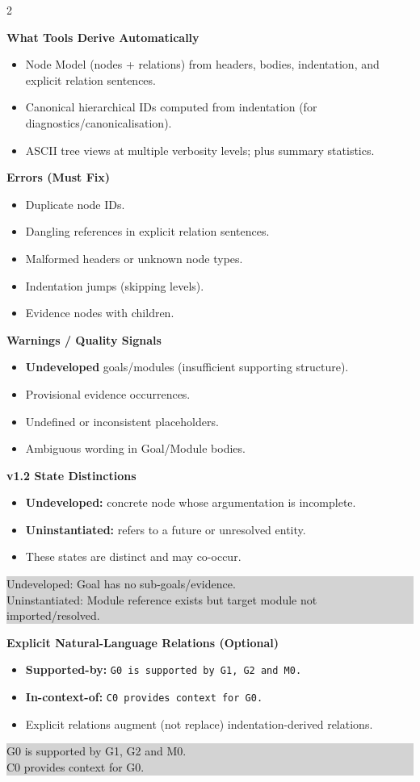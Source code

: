 \documentclass[10pt,letterpaper]{article}
\newcommand{\Sec}[1]{%
  \vspace{5pt}%
  \noindent{\color{RuleGray}\rule{\linewidth}{0.35pt}}\par
  \vspace{2pt}%
  {\bfseries #1}\par
  \vspace{2pt}%
}
\newcommand{\Example}[1]{%
  \vspace{1pt}%
  \noindent\colorbox{LightGray}{%
    \parbox{\linewidth}{\ttfamily\footnotesize\raggedright
#1
    }%
  }%
  \vspace{2pt}%
}
\begin{document}
\begin{multicols*}{2}
\raggedcolumns

\Sec{What Tools Derive Automatically}
\begin{itemize}
  \item Node Model (nodes + relations) from headers, bodies, indentation, and explicit relation sentences.
  \item Canonical hierarchical IDs computed from indentation (for diagnostics/canonicalisation).
  \item ASCII tree views at multiple verbosity levels; plus summary statistics.
\end{itemize}

\Sec{Errors (Must Fix)}
\begin{itemize}
  \item Duplicate node IDs.
  \item Dangling references in explicit relation sentences.
  \item Malformed headers or unknown node types.
  \item Indentation jumps (skipping levels).
  \item Evidence nodes with children.
\end{itemize}

\Sec{Warnings / Quality Signals}
\begin{itemize}
  \item \textbf{Undeveloped} goals/modules (insufficient supporting structure).
  \item Provisional evidence occurrences.
  \item Undefined or inconsistent placeholders.
  \item Ambiguous wording in Goal/Module bodies.
\end{itemize}

\Sec{v1.2 State Distinctions}
\begin{itemize}
  \item \textbf{Undeveloped:} concrete node whose argumentation is incomplete.
  \item \textbf{Uninstantiated:} refers to a future or unresolved entity.
  \item These states are distinct and may co-occur.
\end{itemize}
\Example{Undeveloped: Goal has no sub-goals/evidence.\\
Uninstantiated: Module reference exists but target module not imported/resolved.}

\Sec{Explicit Natural-Language Relations (Optional)}
\begin{itemize}
  \item \textbf{Supported-by:} \texttt{G0 is supported by G1, G2 and M0.}
  \item \textbf{In-context-of:} \texttt{C0 provides context for G0.}
  \item Explicit relations augment (not replace) indentation-derived relations.
\end{itemize}
\Example{G0 is supported by G1, G2 and M0.\\
C0 provides context for G0.}


\end{multicols*}
\end{document}
